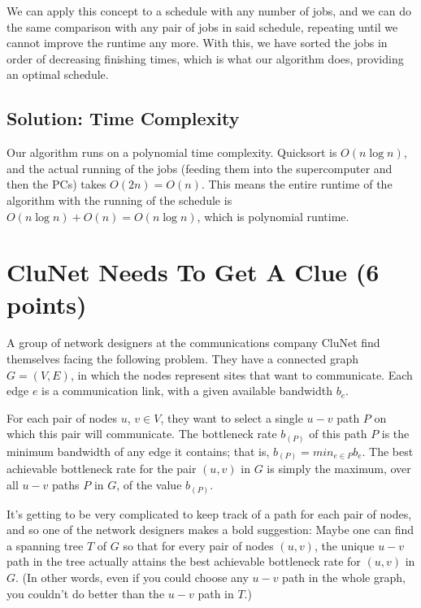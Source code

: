 \documentclass[letter,11pt]{article}
\begin{document}
We can apply this concept to a schedule with any number of jobs, and we can do the same comparison with any pair of jobs in said schedule, repeating until we cannot improve the runtime any more. With this, we have sorted the jobs in order of decreasing finishing times, which is what our algorithm does, providing an optimal schedule.

\subsection{Solution: Time Complexity}

Our algorithm runs on a polynomial time complexity. Quicksort is $O(n\log{}n)$, and the actual running of the jobs (feeding them into the supercomputer and then the PCs) takes $O(2n) = O(n)$. This means the entire runtime of the algorithm with the running of the schedule is $O(n\log{}n) + O(n) = O(n\log{}n)$, which is polynomial runtime.





\section{CluNet Needs To Get A Clue (6 points)}

A group of network designers at the communications company CluNet find themselves facing the following problem. They have a connected graph $G =(V,E)$, in which the nodes represent sites that want to communicate. Each edge $e$ is a communication link, with a given available bandwidth $b_e$.

For each pair of nodes $u$, $v\in V$, they want to select a single $u-v$ path $P$ on which this pair will communicate.  The bottleneck rate $b_{(P)}$ of this path $P$ is the minimum bandwidth of any edge it contains; that is, $b_{(P)}=min_{e\in P} b_e$. The best achievable bottleneck rate for the pair $(u,v)$ in $G$ is simply the maximum, over all $u-v$ paths $P$ in $G$, of the value $b_{(P)}$.

It's getting to be very complicated to keep track of a path for each pair of nodes, and so one of the network designers makes a bold suggestion: Maybe one can find a spanning tree $T$ of $G$ so that for every pair of nodes $(u, v)$, the unique $u-v$ path in the tree actually attains the best achievable bottleneck rate for $(u, v)$ in $G$. (In other words, even if you could choose any $u-v$ path in the whole graph, you couldn't do better than the $u-v$ path in $T$.)
\end{document}
